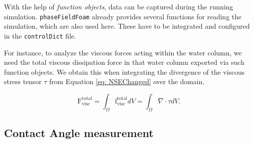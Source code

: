 With the help of \textit{function objects}, data can be captured during the running simulation. \texttt{phaseFieldFoam} already provides several functions for reading the simulation, which are also used here. These have to be integrated and configured in the \texttt{controlDict} file. 

For instance, to analyze the viscous forces acting within the water column, we need the total viscous dissipation force in that water column exported via such function objects. We obtain this when integrating the divergence of the viscous stress tensor $\tau$ from Equation \ref{eq: NSEChanged} over the domain.

\begin{equation}
    \label{eq: totalViscForce}
    \mathrm{F}_{\mathrm{visc}}^{\mathrm{total}} = \int_{\Omega} \mathrm{f}_{\mathrm{visc}}^{\mathrm{total}} dV = \int_{\Omega} \nabla \cdot \tau dV.
\end{equation}


\subsection{Contact Angle measurement}
\label{sec: CA_Measurement}

